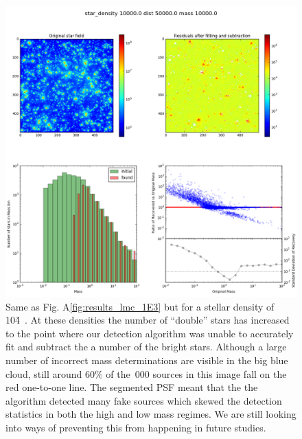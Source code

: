 \begin{figure}

    \centering
    \includegraphics[width=\textwidth]{images/results6_dist=50000_rho=10000}

    \caption{Same as Fig. A\ref{fig:results_lmc_1E3} but for a stellar density of 10\h4~\spa. At these densities the number of ``double'' stars has increased to the point where our detection algorithm was unable to accurately fit and subtract the a number of the bright stars. Although a large number of incorrect mass determinations are visible in the big blue cloud, still around 60\% of the \,000 sources in this image fall on the red one-to-one line. The segmented PSF meant that the the algorithm detected many fake sources which skewed the detection statistics in both the high and low mass regimes. We are still looking into ways of preventing this from happening in future studies.}
    
    \label{fig:results_lmc_1E4}
    
\end{figure}



